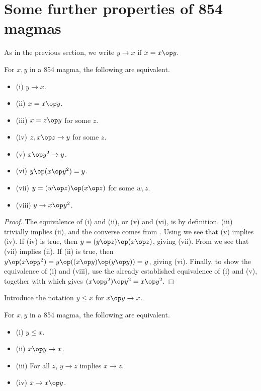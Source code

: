 \section{Some further properties of 854 magmas}

As in the previous section, we write $y \to x$ if $x = x \op y$.

\begin{lemma}[854 equivalences, I]\label{854-equiv}  For $x, y$ in a 854 magma, the following are equivalent.
  \begin{itemize}
  \item (i) $y \to x$.
  \item (ii) $x = x \op y$.
  \item (iii) $x = z \op y$ for some $z$.
  \item (iv) $z, x \op z \to y$ for some $z$.
  \item (v) $x \op y^2 \to y$.
  \item (vi) $y \op (x \op y^2) = y$.
  \item (vii) $y = (w \op z) \op (x \op z)$ for some $w,z$.
  \item (viii) $y \to x \op y^2$.
  \end{itemize}
\end{lemma}

\begin{proof} The equivalence of (i) and (ii), or (v) and (vi), is by definition.  (iii) trivially implies (ii), and the converse comes from .  Using  we see that (v) implies (iv).  If (iv) is true, then $y = (y \op z) \op (x \op z)$, giving (vii).  From  we see that (vii) implies (ii).  If (ii) is true, then $y \op (x \op y^2) = y \op ((x \op y) \op (y \op y)) = y$, giving (vi).  Finally, to show the equivalence of (i) and (viii), use the already established equivalence of (i) and (v), together with  which gives $(x \op y^2) \op y^2 = x \op y^2$.
\end{proof}

Introduce the notation $y \leq x$ for $x \op y \to x$.

\begin{lemma}[854 equivalences, II]\label{854-equiv-2}  For $x,y$ in a 854 magma, the following are equivalent.
  \begin{itemize}
  \item (i) $y \leq x$.
  \item (ii) $x \op y \to x$.
  \item (iii)  For all $z$, $y \to z$ implies $x \to z$.
  \item (iv) $x \to x \op y$.
  \end{itemize}
\end{lemma}

